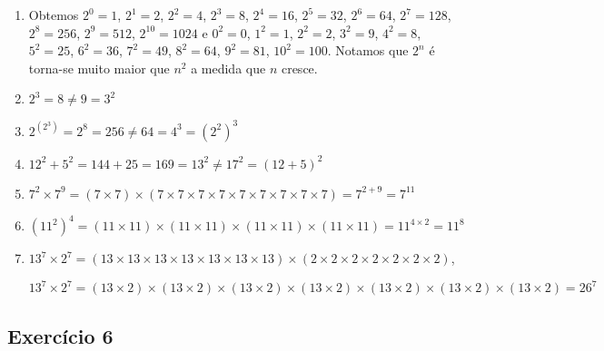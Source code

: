 \begin{enumerate}
\item Obtemos
  $2^0 = 1$,
  $2^1 = 2$,
  $2^2 = 4$,
  $2^3 = 8$,
  $2^4 = 16$,
  $2^5 = 32$,
  $2^6 = 64$,
  $2^7 = 128$,
  $2^8 = 256$,
  $2^9 = 512$,
  $2^{10} = 1024$ e
  $0^2 = 0$,
  $1^2 = 1$,
  $2^2 = 2$,
  $3^2 = 9$,
  $4^2 = 8$,
  $5^2 = 25$,
  $6^2 = 36$,
  $7^2 = 49$,
  $8^2 = 64$,
  $9^2 = 81$,
  $10^2 = 100$.
  Notamos que $2^n$ é torna-se muito maior que $n^2$ a medida que $n$ cresce.
\item $2^3 = 8 \neq 9 = 3^2$
\item $2^{\left(2^3\right)} = 2^8 = 256 \neq 64 = 4^3 = {\left(2^2\right)}^3$
\item $12^2 + 5^2 = 144 + 25 = 169 = 13^2 \neq 17^2 = \left(12+5\right)^2$
\item $7^2 \times 7^9 = \left(7 \times 7\right)
  \times \left(7 \times 7 \times 7 \times 7 \times 7 \times 7 \times 7 \times 7 \times 7\right) = 7^{2+9} = 7^{11}$
\item $\left(11^{2}\right)^4 = \left(11 \times 11 \right)
  \times \left(11 \times 11 \right) \times \left(11 \times 11 \right) \times \left(11 \times 11 \right) = 11^{4 \times 2} = 11^8$
\item $13^7 \times 2^7 =
  \left(13 \times 13 \times 13  \times 13  \times 13  \times 13 \times 13 \right)
  \times
  \left(2 \times 2 \times 2  \times 2  \times 2  \times 2 \times 2 \right)$,

  $13^7 \times 2^7 =
  {\left(13 \times 2\right)
  \times  \left(13 \times 2\right)
  \times  \left(13 \times 2\right)
  \times  \left(13 \times 2\right)
  \times  \left(13 \times 2\right)
  \times  \left(13 \times 2\right)
  \times  \left(13 \times 2\right) } = 26^7$
\end{enumerate}

\subsection*{Exercício 6}

